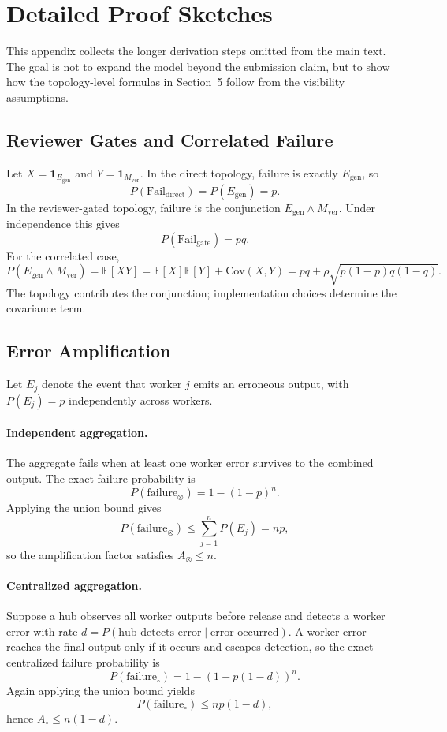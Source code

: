 \section{Detailed Proof Sketches}

This appendix collects the longer derivation steps omitted from the main text. The goal is not to expand
the model beyond the submission claim, but to show how the topology-level formulas in Section~5 follow
from the visibility assumptions.

\subsection{Reviewer Gates and Correlated Failure}

Let $X = \mathbf{1}_{E_{\mathrm{gen}}}$ and $Y = \mathbf{1}_{M_{\mathrm{ver}}}$. In the direct topology,
failure is exactly $E_{\mathrm{gen}}$, so
\[
P(\mathrm{Fail}_{\mathrm{direct}})=P(E_{\mathrm{gen}})=p.
\]
In the reviewer-gated topology, failure is the conjunction
$E_{\mathrm{gen}} \wedge M_{\mathrm{ver}}$. Under independence this gives
\[
P(\mathrm{Fail}_{\mathrm{gate}})=pq.
\]
For the correlated case,
\[
P(E_{\mathrm{gen}} \wedge M_{\mathrm{ver}})
= \mathbb{E}[XY]
= \mathbb{E}[X]\mathbb{E}[Y] + \mathrm{Cov}(X,Y)
= pq + \rho\sqrt{p(1-p)q(1-q)}.
\]
The topology contributes the conjunction; implementation choices determine the covariance term.

\subsection{Error Amplification}

Let $E_j$ denote the event that worker $j$ emits an erroneous output, with $P(E_j)=p$ independently
across workers.

\paragraph{Independent aggregation.}
The aggregate fails when at least one worker error survives to the combined output. The exact failure
probability is
\[
P(\mathrm{failure}_{\otimes}) = 1 - (1-p)^n.
\]
Applying the union bound gives
\[
P(\mathrm{failure}_{\otimes}) \le \sum_{j=1}^{n} P(E_j) = np,
\]
so the amplification factor satisfies $A_{\otimes} \le n$.

\paragraph{Centralized aggregation.}
Suppose a hub observes all worker outputs before release and detects a worker error with rate
$d = P(\text{hub detects error}\mid \text{error occurred})$. A worker error reaches the final output only
if it occurs and escapes detection, so the exact centralized failure probability is
\[
P(\mathrm{failure}_{\circ}) = 1 - (1-p(1-d))^n.
\]
Again applying the union bound yields
\[
P(\mathrm{failure}_{\circ}) \le np(1-d),
\]
hence $A_{\circ} \le n(1-d)$.

